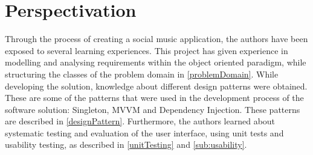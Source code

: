 \chapter{Perspectivation}
\label{cha:perspectivation}

Through the process of creating a social music application, the authors have been exposed to several learning experiences. This project has given experience in modelling and analysing requirements within the object oriented paradigm, while structuring the classes of the problem domain in \cref{problemDomain}.
While developing the solution, knowledge about different design patterns were obtained. These are some of the patterns that were used in the development process of the software solution: Singleton, MVVM and Dependency Injection. These patterns are described in \cref{designPattern}. 
Furthermore, the authors learned about systematic testing and evaluation of the user interface, using unit tests and usability testing, as described in \cref{unitTesting} and \cref{sub:usability}. 
